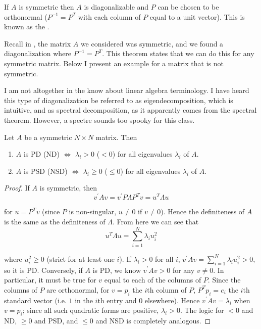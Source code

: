 \documentclass{article}
\begin{document}
\begin{theorem}
  If $A$ is symmetric then $A$ is diagonalizable and $P$ can be chosen to be orthonormal ($P^{-1} = P^T$ with each column of $P$ equal to a unit vector). This is known as the .
\end{theorem}

Recall in , the matrix $A$ we considered was symmetric, and we found a diagonalization where $P^{-1} = P^T$. This theorem states that we can do this for any symmetric matrix. Below I present an example for a matrix that is not symmetric.
\begin{remark}
  I am not altogether in the know about linear algebra terminology. I have heard this type of diagonalization be referred to as eigendecomposition, which is intuitive, and as spectral decomposition, as it apparently comes from the spectral theorem. However, a spectre sounds too spooky for this class.
\end{remark}

\begin{theorem}
  Let $A$ be a symmetric $N \times N$ matrix. Then
  \begin{enumerate}
    \item $A$ is PD (ND) $\iff$ $\lambda_i > 0$ ($< 0$) for all eigenvalues $\lambda_i$ of $A$.
    \item $A$ is PSD (NSD) $\iff$ $\lambda_i \ge 0$ ($\le 0$) for all eigenvalues $\lambda_i$ of $A$.
  \end{enumerate}
\end{theorem}

\begin{proof}
  If $A$ is symmetric, then
  \begin{equation}
    v^\prime A v = v^\prime P \Lambda P^T v = u^T \Lambda u
  \end{equation}

  for $u = P^T v$ (since $P$ is non-singular, $u \ne 0$ if $v \ne 0$). Hence the definiteness of $A$ is the same as the definiteness of $\Lambda$. From here we can see that
  \begin{equation}
    u^T \Lambda u = \sum^{N}_{i = 1} \lambda_i u_i^2
  \end{equation}

  where $u_i^2 \ge 0$ (strict for at least one $i$). If $\lambda_i > 0$ for all $i$, $v^\prime A v = \sum^{N}_{i = 1} \lambda_i u_i^2 > 0$, so it is PD. Conversely, if $A$ is PD, we know $v^\prime A v > 0$ for any $v \ne 0$. In particular, it must be true for $v$ equal to each of the columns of $P$. Since the columns of $P$ are orthonormal, for $v = p_i$ the $i$th column of $P$, $P^T p_i = e_i$ the $i$th standard vector (i.e. $1$ in the $i$th entry and $0$ elsewhere). Hence $v^\prime A v = \lambda_i$ when $v = p_i$; since all such quadratic forms are positive, $\lambda_i > 0$. The logic for $< 0$ and ND, $\ge 0$ and PSD, and $\le 0$ and NSD is completely analogous.
\end{proof}
\end{document}
